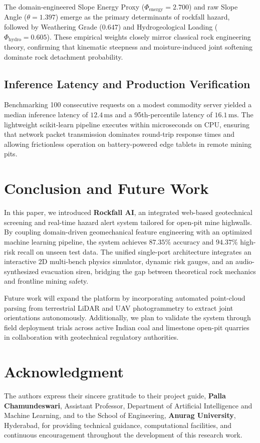\documentclass[conference]{IEEEtran}
\begin{document}
The domain-engineered Slope Energy Proxy ($\Phi_{\text{energy}} = 2.700$) and raw Slope Angle ($\theta = 1.397$) emerge as the primary determinants of rockfall hazard, followed by Weathering Grade ($0.647$) and Hydrogeological Loading ($\Phi_{\text{hydro}} = 0.605$). These empirical weights closely mirror classical rock engineering theory, confirming that kinematic steepness and moisture-induced joint softening dominate rock detachment probability.

\subsection{Inference Latency and Production Verification}
Benchmarking 100 consecutive requests on a modest commodity server yielded a median inference latency of $12.4\,\text{ms}$ and a 95th-percentile latency of $16.1\,\text{ms}$. The lightweight scikit-learn pipeline executes within microseconds on CPU, ensuring that network packet transmission dominates round-trip response times and allowing frictionless operation on battery-powered edge tablets in remote mining pits.

\section{Conclusion and Future Work}
In this paper, we introduced \textbf{Rockfall AI}, an integrated web-based geotechnical screening and real-time hazard alert system tailored for open-pit mine highwalls. By coupling domain-driven geomechanical feature engineering with an optimized machine learning pipeline, the system achieves $87.35\%$ accuracy and $94.37\%$ high-risk recall on unseen test data. The unified single-port architecture integrates an interactive 2D multi-bench physics simulator, dynamic risk gauges, and an audio-synthesized evacuation siren, bridging the gap between theoretical rock mechanics and frontline mining safety.

Future work will expand the platform by incorporating automated point-cloud parsing from terrestrial LiDAR and UAV photogrammetry to extract joint orientations autonomously. Additionally, we plan to validate the system through field deployment trials across active Indian coal and limestone open-pit quarries in collaboration with geotechnical regulatory authorities.

\section*{Acknowledgment}
The authors express their sincere gratitude to their project guide, \textbf{Palla Chamundeswari}, Assistant Professor, Department of Artificial Intelligence and Machine Learning, and to the School of Engineering, \textbf{Anurag University}, Hyderabad, for providing technical guidance, computational facilities, and continuous encouragement throughout the development of this research work.
\end{document}
